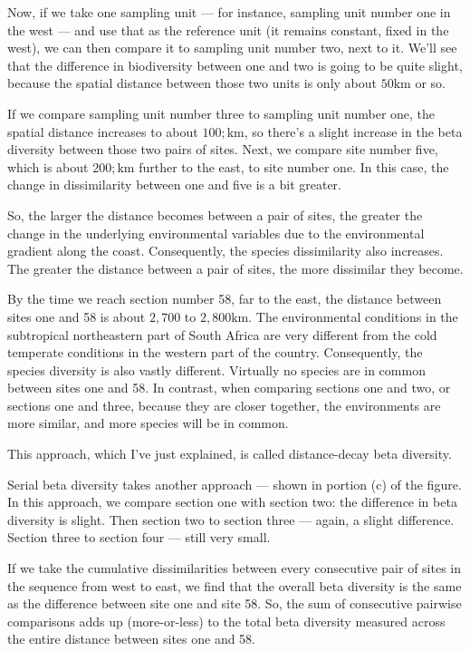 \documentclass[
  11pt,
]{book}
\begin{document}
Now, if we take one sampling unit --- for instance, sampling unit number
one in the west --- and use that as the reference unit (it remains
constant, fixed in the west), we can then compare it to sampling unit
number two, next to it. We'll see that the difference in biodiversity
between one and two is going to be quite slight, because the spatial
distance between those two units is only about \(50\mathrm{km}\) or so.

If we compare sampling unit number three to sampling unit number one,
the spatial distance increases to about \(100;\mathrm{km}\), so there's
a slight increase in the beta diversity between those two pairs of
sites. Next, we compare site number five, which is about
\(200;\mathrm{km}\) further to the east, to site number one. In this
case, the change in dissimilarity between one and five is a bit greater.

So, the larger the distance becomes between a pair of sites, the greater
the change in the underlying environmental variables due to the
environmental gradient along the coast. Consequently, the species
dissimilarity also increases. The greater the distance between a pair of
sites, the more dissimilar they become.

By the time we reach section number 58, far to the east, the distance
between sites one and 58 is about \(2{,}700\) to
\(2{,}800 \mathrm{km}\). The environmental conditions in the subtropical
northeastern part of South Africa are very different from the cold
temperate conditions in the western part of the country. Consequently,
the species diversity is also vastly different. Virtually no species are
in common between sites one and 58. In contrast, when comparing sections
one and two, or sections one and three, because they are closer
together, the environments are more similar, and more species will be in
common.

This approach, which I've just explained, is called distance-decay beta
diversity.

Serial beta diversity takes another approach --- shown in portion (c) of
the figure. In this approach, we compare section one with section two:
the difference in beta diversity is slight. Then section two to section
three --- again, a slight difference. Section three to section four ---
still very small.

If we take the cumulative dissimilarities between every consecutive pair
of sites in the sequence from west to east, we find that the overall
beta diversity is the same as the difference between site one and site
58. So, the sum of consecutive pairwise comparisons adds up
(more-or-less) to the total beta diversity measured across the entire
distance between sites one and 58.
\end{document}

